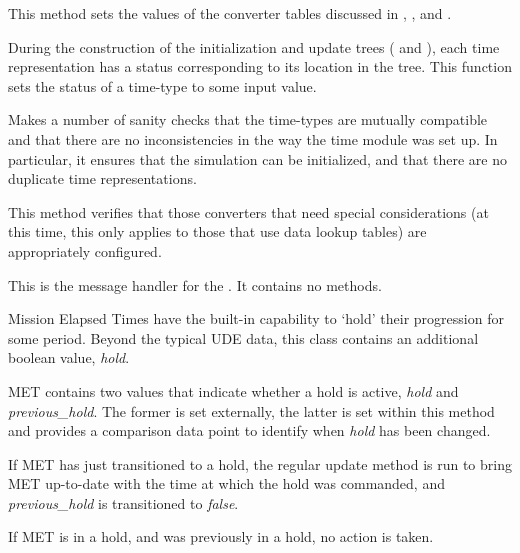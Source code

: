 {\begin{enumerate}
{\begin{enumerate}
This method sets the values of the converter tables discussed in
,
, and
.

During the construction of the initialization and update trees
( and
), each time
representation has a status
corresponding to its location in the tree.  This function sets the
status of a time-type to some input value.

\label{ref:verifytimessetup}Makes a number of sanity checks that the
time-types are mutually compatible and that there are no
inconsistencies in the way the time module was set up.  In particular,
it ensures that the simulation can be initialized, and that there are
no duplicate time representations.

This method verifies that those converters that need special
considerations (at this time, this only applies to those that use data lookup
tables) are appropriately configured.



\end{enumerate}}
This is the message handler for the \timeDesc. It contains no methods.



Mission Elapsed Times have the built-in capability to `hold' their progression
for some period.  Beyond the typical UDE data, this class contains an
additional boolean value, \textit{hold}.
\begin{enumerate}

MET contains two values that indicate whether a hold is active, \textit{hold}
and \textit{previous\_hold}.  The former is set externally, the latter is set
within this method and provides a comparison data point to identify when
\textit{hold} has been changed.

If MET has just transitioned to a hold, the regular update method is run to
bring MET up-to-date with the time at which the hold was commanded, and
\textit{previous\_hold} is transitioned to \textit{false}.

If MET is in a hold, and was previously in a hold, no action is taken.


\end{enumerate}
\end{enumerate}}
